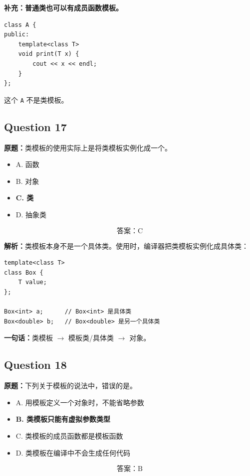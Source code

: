 \documentclass[11pt, a4paper]{article}
\begin{document}
\textbf{补充：普通类也可以有成员函数模板。}
\begin{lstlisting}
class A {
public:
    template<class T>
    void print(T x) {
        cout << x << endl;
    }
};
\end{lstlisting}
这个 \texttt{A} 不是类模板。


\subsection*{Question 17}
\textbf{原题：}类模板的使用实际上是将类模板实例化成一个\underline{\hspace{2cm}}。
\begin{itemize}
    \item A. 函数
    \item B. 对象
    \item \textbf{C. 类}
    \item D. 抽象类
\end{itemize}

\[
\boxed{\text{答案：C}}
\]

\textbf{解析：}类模板本身不是一个具体类。使用时，编译器把类模板实例化成具体类：
\begin{lstlisting}
template<class T>
class Box {
    T value;
};

Box<int> a;      // Box<int> 是具体类
Box<double> b;   // Box<double> 是另一个具体类
\end{lstlisting}

\textbf{一句话：}类模板 $\to$ 模板类/具体类 $\to$ 对象。


\subsection*{Question 18}
\textbf{原题：}下列关于模板的说法中，错误的是\underline{\hspace{2cm}}。
\begin{itemize}
    \item A. 用模板定义一个对象时，不能省略参数
    \item \textbf{B. 类模板只能有虚拟参数类型}
    \item C. 类模板的成员函数都是模板函数
    \item D. 类模板在编译中不会生成任何代码
\end{itemize}

\[
\boxed{\text{答案：B}}
\]
\end{document}
